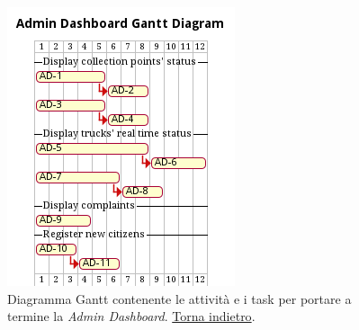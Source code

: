 \begin{figure}[H]
    \centering
    \includegraphics[width=\textwidth]{img/gantt-admin-dashboard.pm}
    \caption{Diagramma Gantt contenente le attività e i task per portare a termine la \textit{Admin Dashboard}. \hyperlink{back:gantt-admin-dashboard}{Torna indietro}.}
    \label{fig:gantt-admin-dashboard}
\end{figure}

